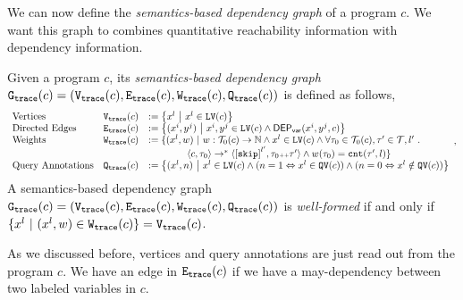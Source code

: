 We can now define the \emph{semantics-based dependency graph} of a program $c$. We want this graph to combines quantitative reachability information with dependency information. 
\begin{defn}
\label{def:trace_graph}
Given a program ${c}$,
its \emph{semantics-based dependency graph} 
$\mathtt{{G_{trace}}}({c}) = (\mathtt{{V_{trace}}}({c}), \mathtt{{E_{trace}}}({c}), \mathtt{{W_{trace}}}({c}), \mathtt{{Q_{trace}}}({c}))$ is defined as follows,
{\small
\[
\begin{array}{lll}
  \text{Vertices} &
  \traceV({c}) & := \left\{ 
  x^l
  ~ \middle\vert ~ x^l \in \lvar(c)
  \right\}
  \\
  \text{Directed Edges} &
  \traceE({c}) & := 
  \left\{ 
  (x^i, y^j) 
  ~ \middle\vert ~
  x^i, y^j \in \lvar(c) \land \vardep(x^i, y^j, c) 
  \right\}
  \\
  \text{Weights} &
  \traceW({c}) & := 
  \{ 
  (x^l, w) 
  ~ \vert ~ 
  w : \tdom_0(c) \to \mathbb{N}
  \land
  x^l \in \lvar(c) \land
  \forall \trace_0 \in \tdom_0(c), \trace' \in \tdom, l' \st
  \\ & & \qquad \qquad
  \config{{c}, \trace_0} \to^{*} 
  \config{\clabel{\eskip}^{l'}, \trace_0 \tracecat \trace'} 
  \land w(\trace_0) = \vcounter(\trace', l) \} 
   \\
  \text{Query Annotations} &
  \traceF({c}) & := 
\left\{(x^l, n)  
~ \middle\vert ~
 x^l \in \lvar(c) \land
(n = 1 \Leftrightarrow x^l \in \qvar(c))\land ( n = 0 \Leftrightarrow  x^l \notin \qvar(c))
\right\}
\end{array},
\]
A semantics-based dependency graph $\mathtt{{G_{trace}}}({c})= (\mathtt{{V_{trace}}}({c}), \mathtt{{E_{trace}}}({c}), \mathtt{{W_{trace}}}({c}), \mathtt{{Q_{trace}}}({c}))$ is \emph{well-formed} if and only if $ \{x^l \ |\ (x^l,w)\in \mathtt{{W_{trace}}}({c})\} = \mathtt{{V_{trace}}}({c}) $.
}
\end{defn}
As we discussed before, vertices and query annotations are just read out from the program $c$. We have an edge in $\mathtt{{E_{trace}}}(c)$ if we have a may-dependency between two labeled variables in $c$.


